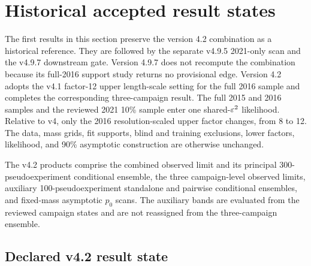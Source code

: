 \providecommand{\VFourPTwoLocalPZeroMinimum}{\ensuremath{3.25918\times10^{-5}}}
\providecommand{\VFourPTwoLocalPZeroMass}{\SI{65}{MeV}}
\providecommand{\VFourPTwoLocalZ}{\ensuremath{3.99321}}
\providecommand{\VFourPTwoEffectiveTrials}{\ensuremath{35.3814}}
\providecommand{\VFourPTwoSidakValue}{\ensuremath{0.00115250}}
\providecommand{\VFourPTwoSidakZ}{\ensuremath{3.04783}}
\providecommand{\VFourPTwoEpsHat}{\ensuremath{6.42706\times10^{-6}}}
\providecommand{\VFourPTwoEpsHatSigma}{\ensuremath{1.61009\times10^{-6}}}

\section{Historical accepted result states}
\label{sec:results}

The first results in this section preserve the version 4.2 combination as a historical
reference.  They are followed by the separate v4.9.5 2021-only scan and the v4.9.7
downstream gate.  Version 4.9.7 does not recompute the combination because its
full-2016 support study returns no provisional edge.  Version 4.2 adopts the v4.1
factor-12 upper length-scale setting for the full 2016 sample and completes the
corresponding three-campaign result.  The full 2015 and 2016 samples and the reviewed
2021 10\% sample enter one shared-$\varepsilon^2$ likelihood.  Relative to v4, only the 2016
resolution-scaled upper factor changes, from 8 to 12.  The data, mass grids, fit
supports, blind and training exclusions, lower factors, likelihood, and 90\%
asymptotic \CLs{} construction are otherwise unchanged.

The v4.2 products comprise the combined observed limit and its principal
300-pseudoexperiment conditional ensemble, the three campaign-level observed
limits, auxiliary 100-pseudoexperiment standalone and pairwise conditional
ensembles, and fixed-mass asymptotic $p_0$ scans. The auxiliary bands are
evaluated from the reviewed campaign states and are not reassigned from the
three-campaign ensemble.

\subsection{Declared v4.2 result state}
\label{sec:results-v4p2-analysis-state}

